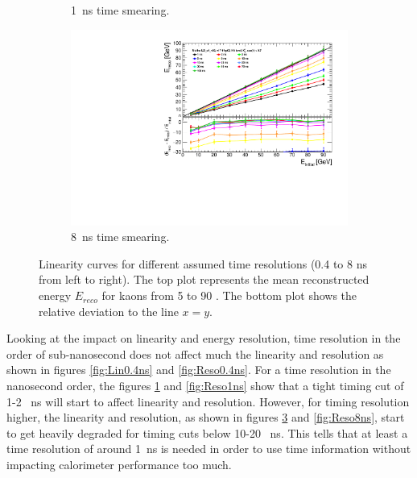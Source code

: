 \begin{figure}[htbp!]
\begin{subfigure}[t]{0.48\textwidth}
    \caption{\SI{1}{\nano\second} time smearing.} \label{fig:Lin1ns}
  \end{subfigure}
  \begin{subfigure}[t]{0.48\textwidth}
    \centering
    \includegraphics[width=1\linewidth]{../Thesis_Plots/ILD/Smearing_8ns/Plots/Linearity_TimeCuts_Smearing3}
    \caption{\SI{8}{\nano\second} time smearing.}  \label{fig:Lin8ns}
  \end{subfigure}
  \caption{Linearity curves for different assumed time resolutions (0.4 to 8 ns from left to right). The top plot represents the mean reconstructed energy $E_{reco}$ for kaons from 5 to 90 \GeV. The bottom plot shows the relative deviation to the line $x=y$.}
\end{figure}

Looking at the impact on linearity and energy resolution, time resolution in the order of sub-nanosecond does not affect much the linearity and resolution as shown in figures \ref{fig:Lin0.4ns} and \ref{fig:Reso0.4ns}. For a time resolution in the nanosecond order, the figures \ref{fig:Lin1ns} and \ref{fig:Reso1ns} show that a tight timing cut of 1-2 \SI{}{\nano\second} will start to affect linearity and resolution. However, for timing resolution higher, the linearity and resolution, as shown in figures \ref{fig:Lin8ns} and \ref{fig:Reso8ns}, start to get heavily degraded for timing cuts below 10-20 \SI{}{\nano\second}. This tells that at least a time resolution of around \SI{1}{\nano\second} is needed in order to use time information without impacting calorimeter performance too much.

